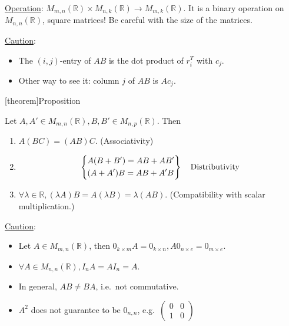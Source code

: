 \documentclass[12pt]{report}
\theoremstyle{definition}
\begin{document}
\underline{Operation}: $M_{m,n}(\mathbb{R}) \times M_{n, k}(\mathbb{R}) \rightarrow{} M_{m, k}(\mathbb{R})$.
It is a binary operation on $M_{n,n}(\mathbb{R})$, square matrices! 
Be careful with the size of the matrices.

\bigskip
\underline{Caution}:

\begin{itemize}
    \item The $(i, j)$-entry of $AB$ is the dot product of $r_i^{T}$ with $c_j$.

    \item Other way to see it: column $j$ of $AB$ is $Ac_j$.
\end{itemize}

[theorem]{Proposition}
\begin{matrix properties}
    Let $A, A' \in M_{m,n}(\mathbb{R}), B, B' \in M_{n,p}(\mathbb{R})$. Then
    \begin{enumerate}[label = (\arabic*)]
        \item $A(BC) = (AB)C$. (Associativity)
        \item \[
            \left\{
                \begin{align*}
                    & A(B + B') = AB + AB' \\
                    & (A + A')B = AB + A'B
                \end{align*}
            \right\} \quad \textnormal{Distributivity}
        \]
                
    \item $\forall \lambda \in \mathbb{R}, (\lambda A)B = A(\lambda B) = \lambda (AB)$.
        (Compatibility with scalar multiplication.)
    \end{enumerate}
    
\end{matrix properties}


\underline{Caution}: 
\begin{itemize}
    \item Let $A \in M_{m,n}(\mathbb{R})$, then $0_{k \times m} A = 0_{k\times n},
        A 0_{n \times e} = 0_{m \times e}$.

    \item $\forall A \in M_{n,n}(\mathbb{R}), I_n A = AI_n = A$.

    \item In general, $AB \neq BA$, i.e.\ not commutative.

    \item $A^2$ does not guarantee to be $0_{n, n}$, e.g.\ $\begin{pmatrix}
            0 & 0 \\
            1 & 0 
    \end{pmatrix} $
\end{itemize}
\end{document}
